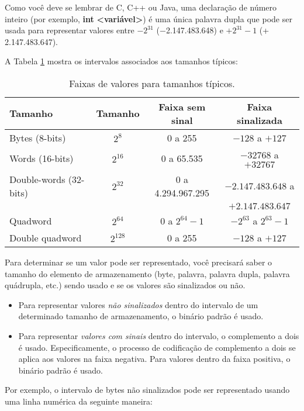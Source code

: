 Como você deve se lembrar de C, C++ ou Java, uma declaração de número inteiro (por exemplo, \textbf{int} \textbf{<variável>}) é uma única palavra dupla que pode ser usada para representar valores entre $ -2^{31} $ (−2.147.483.648) e $ +2^{31} - 1 $ (+ 2.147.483.647).

A Tabela \ref{tab:faixas} mostra os intervalos associados aos tamanhos típicos:

\begin{table}[h]
	\centering
	\small
	\begin{tabular}{|l|c|c|c|}
		\hline
		\rowcolor[HTML]{C0C0C0} 
		\textbf{Tamanho} & \textbf{Tamanho} & \textbf{Faixa sem sinal} & \textbf{Faixa sinalizada} \\ \hline
		Bytes (8-bits) & $2^8$ & 0 a 255 & $-128$ a $+127$\\ \hline
		Words (16-bits) & $2^{16}$ & 0 a 65.535 & $-32768$ a $+32767$\\ \hline
		Double-words (32-bits) & $2^{32}$ & 0 a 4.294.967.295 & $−2.147.483.648$ a\\
		&&& $+2.147.483.647$\\ \hline
		Quadword & $2^{64}$ & 0 a $2^{64}-1$ & $-2^{63}$ a $2^{63}-1$\\ \hline
		Double quadword & $2^{128}$ & 0 a 255 & $-128$ a $+127$\\ \hline
	\end{tabular}
	
	\caption{Faixas de valores para tamanhos típicos.}
	\label{tab:faixas}
\end{table}

Para determinar se um valor pode ser representado, você precisará saber o tamanho do elemento de armazenamento (byte, palavra, palavra dupla, palavra quádrupla, etc.) sendo usado e se os valores são sinalizados ou não.

\begin{itemize}
	\item Para representar valores \textit{não sinalizados} dentro do intervalo de um determinado tamanho de armazenamento, o binário padrão é usado. 
	\item Para representar \textit{valores com sinais} dentro do intervalo, o complemento a dois é usado. Especificamente, o processo de codificação de complemento a dois se aplica aos valores na faixa negativa. Para valores dentro da faixa positiva, o binário padrão é usado.
\end{itemize}

Por exemplo, o intervalo de bytes não sinalizados pode ser representado usando uma linha numérica da seguinte maneira:

